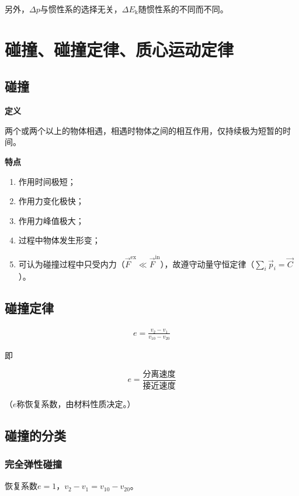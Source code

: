 \documentclass[
	12pt, %
	a4paper, %
]{myLegrandOrangeBook}
\begin{document}
另外，\(\Delta p\)与惯性系的选择无关，\(\Delta E_{\mathrm{k}}\)随惯性系的不同而不同。

\section{碰撞、碰撞定律、质心运动定律}

\subsection{碰撞}

\textbf{定义}

两个或两个以上的物体相遇，相遇时物体之间的相互作用，仅持续极为短暂的时间。

\textbf{特点}

\begin{enumerate}
    \item 作用时间极短；
    \item 作用力变化极快；
    \item 作用力峰值极大；
    \item 过程中物体发生形变；
    \item 可认为碰撞过程中只受内力（\(\overrightarrow{F}^{\mathrm{ex}} \ll \overrightarrow{F}^{\mathrm{in}}\)），故遵守动量守恒定律（\(\sum_{i} \overrightarrow{p}_{i} = \overrightarrow{C}\)）。
\end{enumerate}

\subsection{碰撞定律}

\begin{align}
    e = \frac{v_2 - v_1}{v_{10} - v_{20}}
\end{align}

即

$$
e = \frac{\text{分离速度}}{\text{接近速度}}
$$

（\(e\)称恢复系数，由材料性质决定。）

\subsection{碰撞的分类}

\subsubsection{完全弹性碰撞}

恢复系数\(e=1\)，\(v_2-v_1=v_{10} - v_{20}\)。
\end{document}
